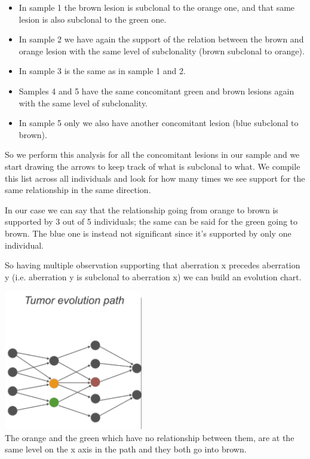 \begin{itemize}
\item
  In sample 1 the brown lesion is subclonal to the orange one, and that same
  lesion is also subclonal to the green one.
\item
  In sample 2 we have again the support of the relation between the brown and
  orange lesion with the same level of subclonality (brown subclonal to orange).
\item
  In sample 3 is the same as in sample 1 and 2.
\item
  Samples 4 and 5 have the same concomitant green and brown lesions again with
  the same level of subclonality.
\item
  In sample 5 only we also have another concomitant lesion (blue subclonal to
  brown).
\end{itemize}

So we perform this analysis for all the concomitant lesions in our sample and we
start drawing the arrows to keep track of what is subclonal to what. We compile
this list across all individuals and look for how many times we see support for
the same relationship in the same direction.

In our case we can say that the relationship going from orange to brown is
supported by 3 out of 5 individuals; the same can be said for the green going to
brown. The blue one is instead not significant since it's supported by only one
individual.

So having multiple observation supporting that aberration x precedes aberration
y (i.e. aberration y is subclonal to aberration x) we can build an evolution
chart.

\includegraphics[width=2.38194in,height=2.40417in]{image5.png}\\

The orange and the green which have no relationship between them, are at the
same level on the x axis in the path and they both go into brown.

